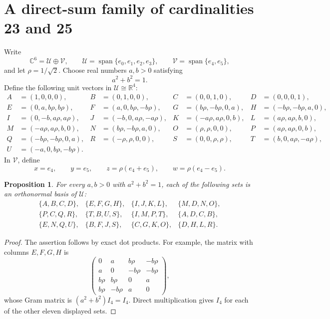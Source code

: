 \documentclass[11pt,a4paper]{article}
\newcommand{\C}{\mathbb{C}}
\newcommand{\R}{\mathbb{R}}
\newtheorem{proposition}{Proposition}
\begin{document}
\section{A direct-sum family of cardinalities 23 and 25}\label{sec:direct}

Write
\[
 \C^6=\mathcal U\oplus\mathcal V,
 \qquad
 \mathcal U=\operatorname{span}\{e_0,e_1,e_2,e_3\},
 \qquad
 \mathcal V=\operatorname{span}\{e_4,e_5\},
\]
and let $\rho=1/\sqrt2$.  Choose real numbers $a,b>0$ satisfying
\[
 a^2+b^2=1.
\]
Define the following unit vectors in $\mathcal U\cong\R^4$:
\begin{align*}
 A&=(1,0,0,0),&
 B&=(0,1,0,0),&
 C&=(0,0,1,0),&
 D&=(0,0,0,1),\\
 E&=(0,a,b\rho,b\rho),&
 F&=(a,0,b\rho,-b\rho),&
 G&=(b\rho,-b\rho,0,a),&
 H&=(-b\rho,-b\rho,a,0),\\
 I&=(0,-b,a\rho,a\rho),&
 J&=(-b,0,a\rho,-a\rho),&
 K&=(-a\rho,a\rho,0,b),&
 L&=(a\rho,a\rho,b,0),\\
 M&=(-a\rho,a\rho,b,0),&
 N&=(b\rho,-b\rho,a,0),&
 O&=(\rho,\rho,0,0),&
 P&=(a\rho,a\rho,0,b),\\
 Q&=(-b\rho,-b\rho,0,a),&
 R&=(-\rho,\rho,0,0),&
 S&=(0,0,\rho,\rho),&
 T&=(b,0,a\rho,-a\rho),\\
 U&=(-a,0,b\rho,-b\rho).&&&&
\end{align*}
In $\mathcal V$, define
\[
 x=e_4,
 \qquad y=e_5,
 \qquad z=\rho(e_4+e_5),
 \qquad w=\rho(e_4-e_5).
\]

\begin{proposition}\label{prop:directbases}
For every $a,b>0$ with $a^2+b^2=1$, each of the following sets is an
orthonormal basis of $\mathcal U$:
\[
\begin{array}{llll}
\{A,B,C,D\}, & \{E,F,G,H\}, & \{I,J,K,L\}, & \{M,D,N,O\},\\
\{P,C,Q,R\}, & \{T,B,U,S\}, & \{I,M,P,T\}, & \{A,D,C,B\},\\
\{E,N,Q,U\}, & \{B,F,J,S\}, & \{C,G,K,O\}, & \{D,H,L,R\}.
\end{array}
\]
\end{proposition}

\begin{proof}
The assertion follows by exact dot products.  For example, the matrix with
columns $E,F,G,H$ is
\[
 \begin{pmatrix}
 0&a&b\rho&-b\rho\\
 a&0&-b\rho&-b\rho\\
 b\rho&b\rho&0&a\\
 b\rho&-b\rho&a&0
 \end{pmatrix},
\]
whose Gram matrix is $(a^2+b^2)I_4=I_4$.  Direct multiplication gives $I_4$
for each of the other eleven displayed sets.
\end{proof}
\end{document}
